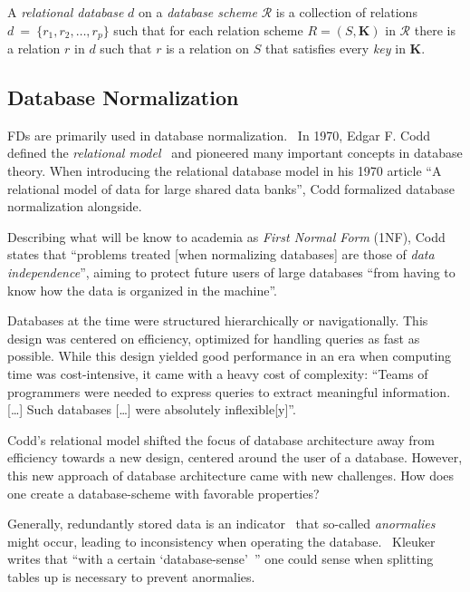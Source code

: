 A \emph{relational database} \( d \) on a \emph{database scheme} \( \mathcal{R} \) is a collection of relations \( d~=~\{r_1, r_2, \dots, r_p \} \) such that for each relation scheme \(R = (S, \boldsymbol{K}) \) in \( \mathcal{R} \) there is a relation \(r\) in \(d\) such that \(r\) is a relation on \(S\) that satisfies every \emph{key} in \(\boldsymbol{K}\).~\cite[p.~94]{MAI83}


\subsection{Database Normalization}
FDs are primarily used in database normalization.~\cite[p.~1]{CAR16}
In 1970, Edgar F. Codd defined the \emph{relational model}~\cite{COD70} and pioneered many important concepts in database theory.
When introducing the relational database model in his 1970 article ``A relational model of data for large shared data banks'', Codd formalized database normalization alongside.~\cite{COD70}

Describing what will be know to academia as \emph{First Normal Form} (1NF), Codd states that ``problems treated [when normalizing databases] are those of \emph{data independence}'', aiming to protect future users of large databases ``from having to know how the data is organized in the machine''.~\cite[p.~1]{COD70}

Databases at the time were structured hierarchically or navigationally.
This design was centered on efficiency, optimized for handling queries as fast as possible.
While this design yielded good performance in an era when computing time was cost-intensive, it came with a heavy cost of complexity:
``Teams of programmers were needed to express queries to extract meaningful information. [\dots] Such databases [\dots] were absolutely inflexible[y]''.~\cite{IBM03}

Codd's relational model shifted the focus of database architecture away from efficiency towards a new design, centered around the user of a database.
However, this new approach of database architecture came with new challenges.
How does one create a database-scheme with favorable properties?

Generally, redundantly stored data is an indicator~\cite[p.~61]{WAT14} that so-called \emph{anormalies} might occur, leading to inconsistency when operating the database.~\cite[p.~162]{STU16}
Kleuker writes that ``with a certain `database-sense'\ '' one could sense when splitting tables up is necessary to prevent anormalies.~\cite[p.~76]{KLE11}

